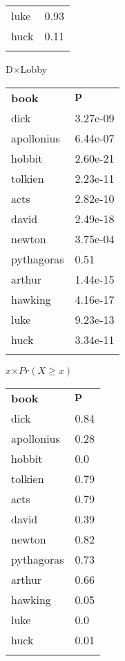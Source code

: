 \begin{table}[ht]
\begin{center}
{\begin{minipage}{0.3\textwidth}
\begin{tabular}{@{}p{1.6cm}p{1.3cm}@{}}
		luke & 0.93 \\ 
		huck & 0.11 \\ 
	\botrule\end{tabular}\end{minipage}
\begin{minipage}{0.3\textwidth}
\hspace{.7cm}\hbox{D$\times$Lobby} \par \smallskip
	\begin{tabular}{@{}p{1.6cm}p{1.3cm}@{}} \toprule 
		\bf book & $\mathbf p$ \\ \colrule 
		dick & 3.27e-09 \\ 
		apollonius & 6.44e-07 \\ 
		hobbit & 2.60e-21 \\ 
		tolkien & 2.23e-11 \\ 
		acts & 2.82e-10 \\ 
		david & 2.49e-18 \\ 
		newton & 3.75e-04 \\ 
		pythagoras & 0.51 \\ 
		arthur & 1.44e-15 \\ 
		hawking & 4.16e-17 \\ 
		luke & 9.23e-13 \\ 
		huck & 3.34e-11 \\ 
	\botrule\end{tabular}\end{minipage}

}
	\end{center}
\end{table}
\begin{table}[ht]
	\begin{center} 
{\begin{minipage}{0.4\textwidth}
\hspace{.7cm}\hbox{$x$$\times$$Pr(X\geq x)$} \par \smallskip
	\begin{tabular}{@{}p{1.6cm}p{1.3cm}@{}} \toprule 
		\bf book & $\mathbf p$ \\ \colrule 
		dick & 0.84 \\ 
		apollonius & 0.28 \\ 
		hobbit & 0.0 \\ 
		tolkien & 0.79 \\ 
		acts & 0.79 \\ 
		david & 0.39 \\ 
		newton & 0.82 \\ 
		pythagoras & 0.73 \\ 
		arthur & 0.66 \\ 
		hawking & 0.05 \\ 
		luke & 0.0 \\ 
		huck & 0.01 \\ 
	\botrule\end{tabular}\end{minipage}

}
	\end{center}
\end{table}
